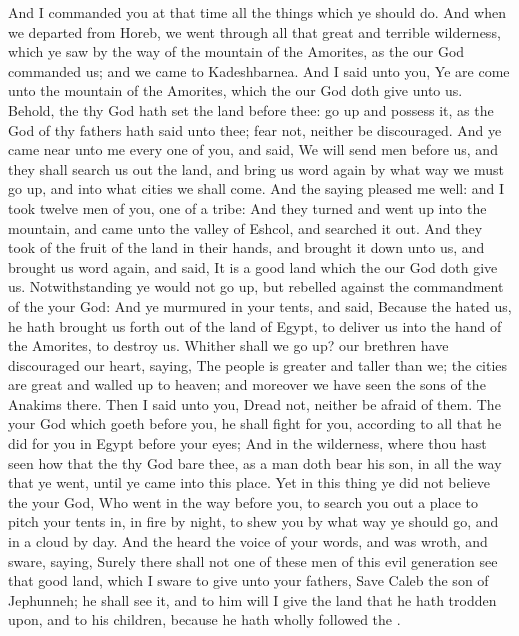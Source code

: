 \begin{biblechapter}
\verse And I commanded you at that time all the things which ye should do.
 And when we departed from Horeb, we went through all that great and terrible wilderness, which ye saw by the way of the mountain of the Amorites, as the \LORD our God commanded us; and we came to Kadeshbarnea.
\verse And I said unto you, Ye are come unto the mountain of the Amorites, which the \LORD our God doth give unto us.
\verse Behold, the \LORD thy God hath set the land before thee: go up and possess it, as the \LORD God of thy fathers hath said unto thee; fear not, neither be discouraged.
\verse And ye came near unto me every one of you, and said, We will send men before us, and they shall search us out the land, and bring us word again by what way we must go up, and into what cities we shall come.
\verse And the saying pleased me well: and I took twelve men of you, one of a tribe:
\verse And they turned and went up into the mountain, and came unto the valley of Eshcol, and searched it out.
\verse And they took of the fruit of the land in their hands, and brought it down unto us, and brought us word again, and said, It is a good land which the \LORD our God doth give us.
 Notwithstanding ye would not go up, but rebelled against the commandment of the \LORD your God:
\verse And ye murmured in your tents, and said, Because the \LORD hated us, he hath brought us forth out of the land of Egypt, to deliver us into the hand of the Amorites, to destroy us.
\verse Whither shall we go up? our brethren have discouraged our heart, saying, The people is greater and taller than we; the cities are great and walled up to heaven; and moreover we have seen the sons of the Anakims there.
\verse Then I said unto you, Dread not, neither be afraid of them.
\verse The \LORD your God which goeth before you, he shall fight for you, according to all that he did for you in Egypt before your eyes;
\verse And in the wilderness, where thou hast seen how that the \LORD thy God bare thee, as a man doth bear his son, in all the way that ye went, until ye came into this place.
\verse Yet in this thing ye did not believe the \LORD your God,
\verse Who went in the way before you, to search you out a place to pitch your tents in, in fire by night, to shew you by what way ye should go, and in a cloud by day.
\verse And the \LORD heard the voice of your words, and was wroth, and sware, saying,
\verse Surely there shall not one of these men of this evil generation see that good land, which I sware to give unto your fathers,
\verse Save Caleb the son of Jephunneh; he shall see it, and to him will I give the land that he hath trodden upon, and to his children, because he hath wholly followed the \LORD.

\end{biblechapter}
